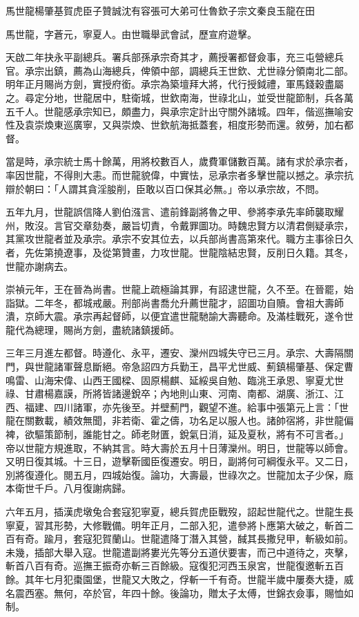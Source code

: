 
\begin{pinyinscope}
馬世龍楊肇基賀虎臣子贊誠沈有容張可大弟可仕魯欽子宗文秦良玉龍在田

馬世龍，字蒼元，寧夏人。由世職舉武會試，歷宣府遊擊。

天啟二年抉永平副總兵。署兵部孫承宗奇其才，薦授署都督僉事，充三屯營總兵官。承宗出鎮，薦為山海總兵，俾領中部，調總兵王世欽、尤世祿分領南北二部。明年正月賜尚方劍，實授府銜。承宗為築壇拜大將，代行授鉞禮，軍馬錢穀盡屬之。尋定分地，世龍居中，駐衛城，世欽南海，世祿北山，並受世龍節制，兵各萬五千人。世龍感承宗知已，頗盡力，與承宗定計出守關外諸城。四年，偕巡撫喻安性及袁崇煥東巡廣寧，又與崇煥、世欽航海抵蓋套，相度形勢而還。敘勞，加右都督。

當是時，承宗統士馬十餘萬，用將校數百人，歲費軍儲數百萬。諸有求於承宗者，率因世龍，不得則大恚。而世龍貌偉，中實怯，忌承宗者多擊世龍以撼之。承宗抗辯於朝曰：「人謂其貪淫朘削，臣敢以百口保其必無。」帝以承宗故，不問。

五年九月，世龍誤信降人劉伯漒言、遣前鋒副將魯之甲、參將李承先率師襲取耀州，敗沒。言官交章劾奏，嚴旨切責，令戴罪圖功。時魏忠賢方以清君側疑承宗，其黨攻世龍者並及承宗。承宗不安其位去，以兵部尚書高第來代。職方主事徐日久者，先佐第撓遼事，及從第贊畫，力攻世龍。世龍陰結忠賢，反削日久籍。其冬，世龍亦謝病去。

崇禎元年，王在晉為尚書。世龍上疏極論其罪，有詔逮世龍，久不至。在晉罷，始詣獄。二年冬，都城戒嚴。刑部尚書喬允升薦世龍才，詔圖功自贖。會祖大壽師潰，京師大震。承宗再起督師，以便宜遣世龍馳諭大壽聽命。及滿桂戰死，遂令世龍代為總理，賜尚方劍，盡統諸鎮援師。

三年三月進左都督。時遵化、永平，遷安、灤州四城失守已三月。承宗、大壽隔關門，與世龍諸軍聲息斷絕。帝急詔四方兵勤王，昌平尤世威、薊鎮楊肇基、保定曹鳴雷、山海宋偉、山西王國樑、固原楊麒、延綏吳自勉、臨洮王承恩、寧夏尤世祿、甘肅楊嘉謨，所將皆諸邊銳卒；內地則山東、河南、南都、湖廣、浙江、江西、福建、四川諸軍，亦先後至。并壁薊門，觀望不進。給事中張第元上言：「世龍在關數載，績效無聞，非若衛、霍之儔，功名足以服人也。諸帥宿將，非世龍偏裨，欲驅策節制，誰能甘之。師老財匱，銳氣日消，延及夏秋，將有不可言者。」帝以世龍方規進取，不納其言。時大壽於五月十日薄灤州。明日，世龍等以師會。又明日復其城。十三日，遊擊靳國臣復遷安。明日，副將何可綱復永平。又二日，別將復遵化。閱五月，四城始復。論功，大壽最，世祿次之。世龍加太子少保，廕本衛世千戶。八月復謝病歸。

六年五月，插漢虎墩兔合套寇犯寧夏，總兵賀虎臣戰歿，詔起世龍代之。世龍生長寧夏，習其形勢，大修戰備。明年正月，二部入犯，遣參將卜應第大破之，斬首二百有奇。踰月，套寇犯賀蘭山。世龍遣降丁潛入其營，馘其長撒兒甲，斬級如前。未幾，插部大舉入寇。世龍遣副將婁光先等分五道伏要害，而己中道待之，夾擊，斬首八百有奇。巡撫王振奇亦斬三百餘級。寇復犯河西玉泉宮，世龍復邀斬五百餘。其年七月犯棗園堡，世龍又大敗之，俘斬一千有奇。世龍半歲中屢奏大捷，威名震西塞。無何，卒於官，年四十餘。後論功，贈太子太傅，世錦衣僉事，賜恤如制。


\end{pinyinscope}
